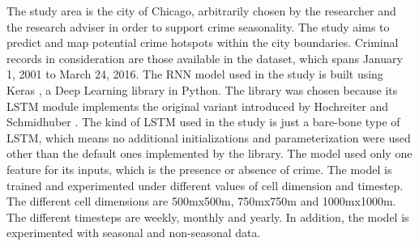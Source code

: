     The study area is the city of Chicago, arbitrarily chosen by the researcher and the research adviser in order to support crime seasonality. The study aims to predict and map potential crime hotspots within the city boundaries. Criminal records in consideration are those available in the dataset, which spans January 1, 2001 to March 24, 2016. The RNN model used in the study is built using Keras \citeyearpar{chollet2015keras}, a Deep Learning library in Python. The library was chosen because its LSTM module implements the original variant introduced by Hochreiter and Schmidhuber \citeyearpar{hochreiter1997long}. The kind of LSTM used in the study is just a bare-bone type of LSTM, which means no additional initializations and parameterization were used other than the default ones implemented by the library. The model used only one feature for its inputs, which is the presence or absence of crime. The model is trained and experimented under different values of cell dimension and timestep. The different cell dimensions are 500mx500m, 750mx750m and 1000mx1000m. The different timesteps are weekly, monthly and yearly. In addition, the model is experimented with seasonal and non-seasonal data.